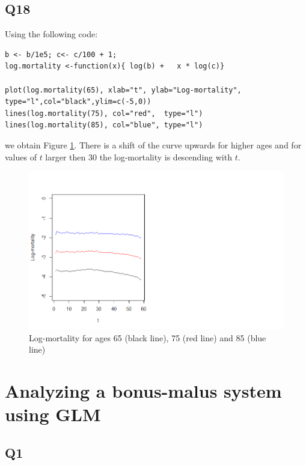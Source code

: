 \documentclass[11pt]{article}
\begin{document}
\subsection*{Q18}

Using the following code:
\begin{verbatim}
b <- b/1e5; c<- c/100 + 1;
log.mortality <-function(x){ log(b) + 	x * log(c)}

plot(log.mortality(65), xlab="t", ylab="Log-mortality", type="l",col="black",ylim=c(-5,0))
lines(log.mortality(75), col="red",  type="l")
lines(log.mortality(85), col="blue", type="l")
\end{verbatim}

we obtain Figure \ref{Figure_Question18}. There is a shift of the curve upwards for higher ages and for values of $t$ larger then 30 the log-mortality is descending with $t$.

\begin{center}
	\begin{figure}[H]
		
		\includegraphics[scale=0.60]{NL3_Question18.png}
		
		\caption{Log-mortality for ages 65 (black line), 75 (red line) and 85 (blue line)}
		\label{Figure_Question18}
		
	\end{figure}
\end{center}


\section{Analyzing a bonus-malus system using GLM}

\subsection*{Q1}
\end{document}
